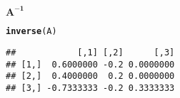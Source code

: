 \documentclass[11pt, a4paper]{article}\usepackage[]{graphicx}\usepackage[]{xcolor}
\makeatletter
\newcommand{\hldef}[1]{\textcolor[rgb]{0.345,0.345,0.345}{#1}}%
\newcommand{\hlkwd}[1]{\textcolor[rgb]{0.737,0.353,0.396}{\textbf{#1}}}%
\newenvironment{kframe}{%
 \def\at@end@of@kframe{}%
 \ifinner\ifhmode%
  \def\at@end@of@kframe{\end{minipage}}%
  \begin{minipage}{\columnwidth}%
 \fi\fi%
 \def\FrameCommand##1{\hskip\@totalleftmargin \hskip-\fboxsep
 \colorbox{shadecolor}{##1}\hskip-\fboxsep
     \hskip-\linewidth \hskip-\@totalleftmargin \hskip\columnwidth}%
 \MakeFramed {\advance\hsize-\width
   \@totalleftmargin\z@ \linewidth\hsize
   \@setminipage}}%
 {\par\unskip\endMakeFramed%
 \at@end@of@kframe}
\newenvironment{knitrout}{}{} %
\makeatother
\begin{document}
\faArrowAltCircleRight[regular] $\mathbf{A^{-1}}$

\begin{knitrout}
\color{fgcolor}\begin{kframe}
\begin{alltt}
\hlkwd{inverse}\hldef{(A)}
\end{alltt}
\begin{verbatim}
##            [,1] [,2]      [,3]
## [1,]  0.6000000 -0.2 0.0000000
## [2,]  0.4000000  0.2 0.0000000
## [3,] -0.7333333 -0.2 0.3333333
\end{verbatim}
\end{kframe}
\end{knitrout}
\end{document}
